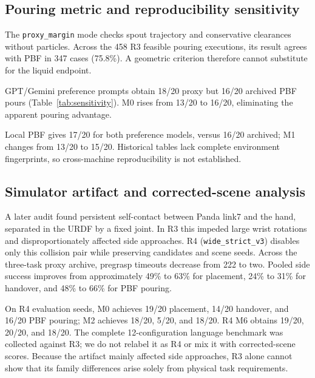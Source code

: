 \documentclass{article}
\newcommand{\code}[1]{\texttt{#1}}
\begin{document}
\subsection{Pouring metric and reproducibility sensitivity}
The \code{proxy\_margin} mode checks spout trajectory and conservative clearances without particles. Across the 458 R3 feasible pouring executions, its result agrees with PBF in 347 cases (75.8\%). A geometric criterion therefore cannot substitute for the liquid endpoint.

\begin{table}[htbp]
\caption{Pouring sensitivity on the same 20 evaluation seeds. R3 full PBF is primary; local PBF re-executes selected candidates. R4 changes the wrist--hand collision setting and is a separate sensitivity condition. Counts are out of 20; -- means not evaluated here.}
\label{tab:sensitivity}
\centering\footnotesize

\end{table}

GPT/Gemini preference prompts obtain 18/20 proxy but 16/20 archived PBF pours (Table~\ref{tab:sensitivity}). M0 rises from 13/20 to 16/20, eliminating the apparent pouring advantage.

Local PBF gives 17/20 for both preference models, versus 16/20 archived; M1 changes from 13/20 to 15/20. Historical tables lack complete environment fingerprints, so cross-machine reproducibility is not established.

\subsection{Simulator artifact and corrected-scene analysis}
A later audit found persistent self-contact between Panda link7 and the hand, separated in the URDF by a fixed joint. In R3 this impeded large wrist rotations and disproportionately affected side approaches. R4 (\code{wide\_strict\_v3}) disables only this collision pair while preserving candidates and scene seeds. Across the three-task proxy archive, pregrasp timeouts decrease from 222 to two. Pooled side success improves from approximately 49\% to 63\% for placement, 24\% to 31\% for handover, and 48\% to 66\% for PBF pouring.

On R4 evaluation seeds, M0 achieves 19/20 placement, 14/20 handover, and 16/20 PBF pouring; M2 achieves 18/20, 5/20, and 18/20. R4 M6 obtains 19/20, 20/20, and 18/20. The complete 12-configuration language benchmark was collected against R3; we do not relabel it as R4 or mix it with corrected-scene scores. Because the artifact mainly affected side approaches, R3 alone cannot show that its family differences arise solely from physical task requirements.
\end{document}
